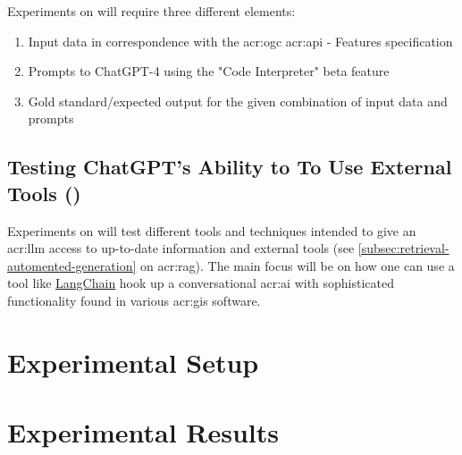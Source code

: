 Experiments on  will require three different elements:

\begin{enumerate}
    \item Input data in correspondence with the \acrshort{acr:ogc} \acrshort{acr:api} - Features specification
    \item Prompts to ChatGPT-4 using the "Code Interpreter" beta feature
    \item Gold standard/expected output for the given combination of input data and prompts
\end{enumerate}

\subsection[Testing ChatGPT's Ability to To Use External Tools (RQ 2)]{Testing ChatGPT's Ability to To Use External Tools ()}

Experiments on  will test different tools and techniques intended to give an \acrshort{acr:llm} access to up-to-date information and external tools (see \autoref{subsec:retrieval-automented-generation} on \acrlong{acr:rag}). The main focus will be on how one can use a tool like \hyperref[subsubsec:langchain]{LangChain} hook up a conversational \acrshort{acr:ai} with sophisticated functionality found in various \acrshort{acr:gis} software.

\section{Experimental Setup}
\label{sec:experimentalSetup}

\begin{comment}
The experimental setup should include all data --- parameters, etc. --- that would allow a person to repeat your experiments.
This will thus be the actual instantiation for each experiment of the general architecture described in Chapter~\ref{cha:architecture}.
\end{comment}

\section{Experimental Results}
\label{sec:experimentalResults}

